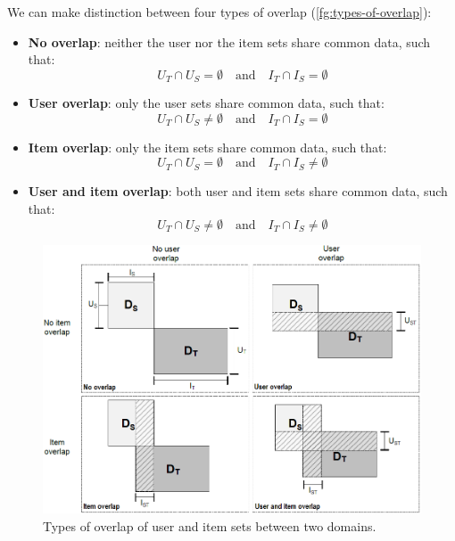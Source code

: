 We can make distinction between four types of overlap (\autoref{fg:types-of-overlap}):
\begin{itemize}
\item \textbf{No overlap}: neither the user nor the item sets share common data, such that:
\begin{equation*}
U_T \cap U_S = \emptyset \quad \text{and} \quad I_T \cap I_S = \emptyset
\end{equation*}
\item \textbf{User overlap}: only the user sets share common data, such that:
\begin{equation*}
U_T \cap U_S \neq \emptyset \quad \text{and} \quad I_T \cap I_S = \emptyset
\end{equation*}
\item \textbf{Item overlap}: only the item sets share common data, such that:
\begin{equation*}
U_T \cap U_S = \emptyset \quad \text{and} \quad I_T \cap I_S \neq \emptyset
\end{equation*}
\item \textbf{User and item overlap}: both user and item sets share common data, such that:
\begin{equation*}
U_T \cap U_S \neq \emptyset \quad \text{and} \quad I_T \cap I_S \neq \emptyset
\end{equation*}
\end{itemize}
\begin{figure}[hbt]
\centering
\includegraphics[width=\textwidth]{pictures/domains-overlap}
\caption{Types of overlap of user and item sets between two domains. \cite{10.1007/978-1-4899-7637-6_27}}
\label{fg:types-of-overlap}
\end{figure}


